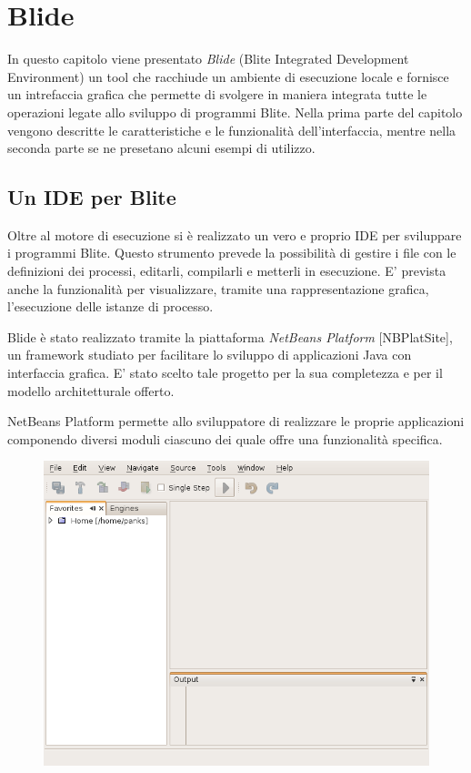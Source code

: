 \chapter{Blide}

\textsf{
In questo capitolo viene presentato \emph{Blide} (Blite Integrated Development
Environment) un tool che racchiude un ambiente di esecuzione locale e
fornisce un intrefaccia grafica che permette di svolgere in maniera integrata
tutte le operazioni legate allo sviluppo di programmi Blite. Nella prima parte
del capitolo vengono descritte le caratteristiche e le funzionalità
dell'interfaccia, mentre nella seconda parte se ne presetano alcuni
esempi di utilizzo.
}

\section{Un IDE per Blite}

Oltre al motore di esecuzione si è realizzato un vero e proprio IDE per
sviluppare i programmi Blite. Questo strumento prevede la possibilità di
gestire i file con le definizioni dei processi, editarli, compilarli e metterli
in esecuzione. E' prevista anche la funzionalità per visualizzare, tramite una
rappresentazione grafica, l'esecuzione delle istanze di processo.

Blide è stato realizzato tramite la piattaforma \emph{NetBeans Platform}
[NBPlatSite], un framework studiato per facilitare lo sviluppo di applicazioni
Java con interfaccia grafica. E' stato scelto tale progetto per la sua
completezza e per il modello architetturale offerto. 

NetBeans Platform permette allo sviluppatore di realizzare le proprie
applicazioni componendo diversi moduli ciascuno dei quale offre una
funzionalità specifica.

\begin{figure}[b]
\begin{center}
\includegraphics[scale=0.60]
{blide/dia/Blide1}
\caption[] {}
  \label{fig:blide1}
\end{center}
\end{figure}
 
